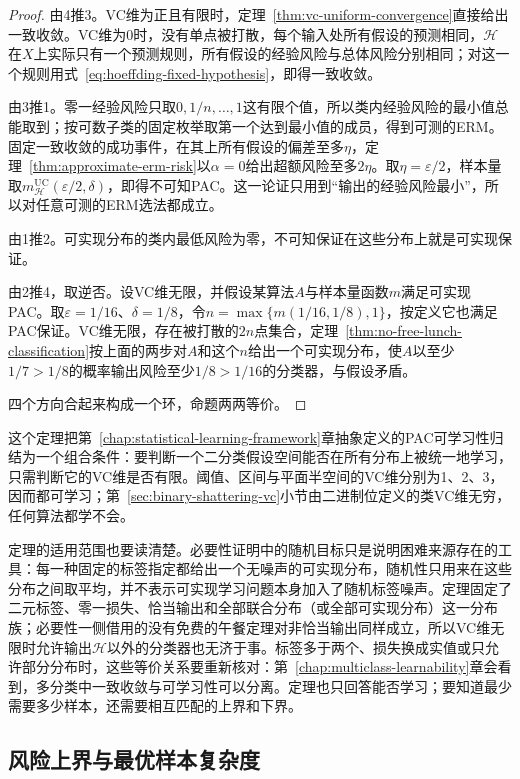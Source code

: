\begin{proof}
由4推3。VC维为正且有限时，定理~\ref{thm:vc-uniform-convergence}直接给出一致收敛。VC维为0时，没有单点被打散，每个输入处所有假设的预测相同，$\mathcal H$在$X$上实际只有一个预测规则，所有假设的经验风险与总体风险分别相同；对这一个规则用式~\eqref{eq:hoeffding-fixed-hypothesis}，即得一致收敛。

由3推1。零一经验风险只取$0,1/n,\ldots,1$这有限个值，所以类内经验风险的最小值总能取到；按可数子类的固定枚举取第一个达到最小值的成员，得到可测的ERM。固定一致收敛的成功事件，在其上所有假设的偏差至多$\eta$，定理~\ref{thm:approximate-erm-risk}以$\alpha=0$给出超额风险至多$2\eta$。取$\eta=\varepsilon/2$，样本量取$m_{\mathcal H}^{\mathrm{UC}}(\varepsilon/2,\delta)$，即得不可知PAC。这一论证只用到“输出的经验风险最小”，所以对任意可测的ERM选法都成立。

由1推2。可实现分布的类内最低风险为零，不可知保证在这些分布上就是可实现保证。

由2推4，取逆否。设VC维无限，并假设某算法$A$与样本量函数$m$满足可实现PAC。取$\varepsilon=1/16$、$\delta=1/8$，令$n=\max\{m(1/16,1/8),1\}$，按定义它也满足PAC保证。VC维无限，存在被打散的$2n$点集合，定理~\ref{thm:no-free-lunch-classification}按上面的两步对$A$和这个$n$给出一个可实现分布，使$A$以至少$1/7>1/8$的概率输出风险至少$1/8>1/16$的分类器，与假设矛盾。

四个方向合起来构成一个环，命题两两等价。
\end{proof}

这个定理把第~\ref{chap:statistical-learning-framework}章抽象定义的PAC可学习性归结为一个组合条件：要判断一个二分类假设空间能否在所有分布上被统一地学习，只需判断它的VC维是否有限。阈值、区间与平面半空间的VC维分别为1、2、3，因而都可学习；第~\ref{sec:binary-shattering-vc}小节由二进制位定义的类VC维无穷，任何算法都学不会。

定理的适用范围也要读清楚。必要性证明中的随机目标只是说明困难来源存在的工具：每一种固定的标签指定都给出一个无噪声的可实现分布，随机性只用来在这些分布之间取平均，并不表示可实现学习问题本身加入了随机标签噪声。定理固定了二元标签、零一损失、恰当输出和全部联合分布（或全部可实现分布）这一分布族；必要性一侧借用的没有免费的午餐定理对非恰当输出同样成立，所以VC维无限时允许输出$\mathcal H$以外的分类器也无济于事。标签多于两个、损失换成实值或只允许部分分布时，这些等价关系要重新核对：第~\ref{chap:multiclass-learnability}章会看到，多分类中一致收敛与可学习性可以分离。定理也只回答能否学习；要知道最少需要多少样本，还需要相互匹配的上界和下界。

\subsection{风险上界与最优样本复杂度}

